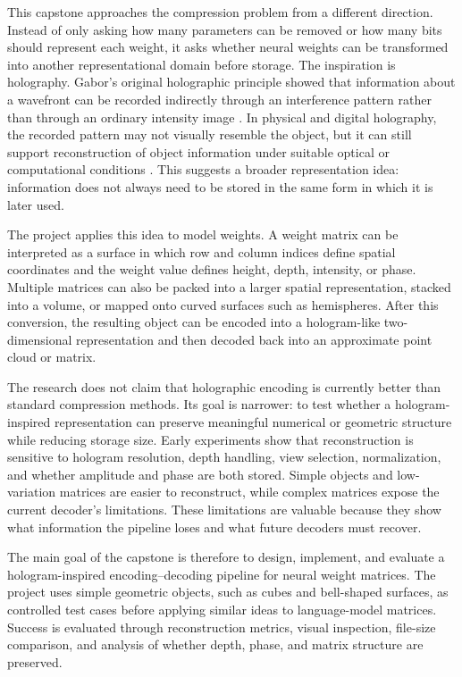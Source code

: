 \documentclass{article}
\begin{document}
\begin{normalsize}
This capstone approaches the compression problem from a different direction. Instead of only asking how many parameters can be removed or how many bits should represent each weight, it asks whether neural weights can be transformed into another representational domain before storage. The inspiration is holography. Gabor's original holographic principle showed that information about a wavefront can be recorded indirectly through an interference pattern rather than through an ordinary intensity image \cite{gabor1948}. In physical and digital holography, the recorded pattern may not visually resemble the object, but it can still support reconstruction of object information under suitable optical or computational conditions \cite{goodman2005}. This suggests a broader representation idea: information does not always need to be stored in the same form in which it is later used.

The project applies this idea to model weights. A weight matrix can be interpreted as a surface in which row and column indices define spatial coordinates and the weight value defines height, depth, intensity, or phase. Multiple matrices can also be packed into a larger spatial representation, stacked into a volume, or mapped onto curved surfaces such as hemispheres. After this conversion, the resulting object can be encoded into a hologram-like two-dimensional representation and then decoded back into an approximate point cloud or matrix.

The research does not claim that holographic encoding is currently better than standard compression methods. Its goal is narrower: to test whether a hologram-inspired representation can preserve meaningful numerical or geometric structure while reducing storage size. Early experiments show that reconstruction is sensitive to hologram resolution, depth handling, view selection, normalization, and whether amplitude and phase are both stored. Simple objects and low-variation matrices are easier to reconstruct, while complex matrices expose the current decoder's limitations. These limitations are valuable because they show what information the pipeline loses and what future decoders must recover.

The main goal of the capstone is therefore to design, implement, and evaluate a hologram-inspired encoding--decoding pipeline for neural weight matrices. The project uses simple geometric objects, such as cubes and bell-shaped surfaces, as controlled test cases before applying similar ideas to language-model matrices. Success is evaluated through reconstruction metrics, visual inspection, file-size comparison, and analysis of whether depth, phase, and matrix structure are preserved.


\end{normalsize}
\end{document}
